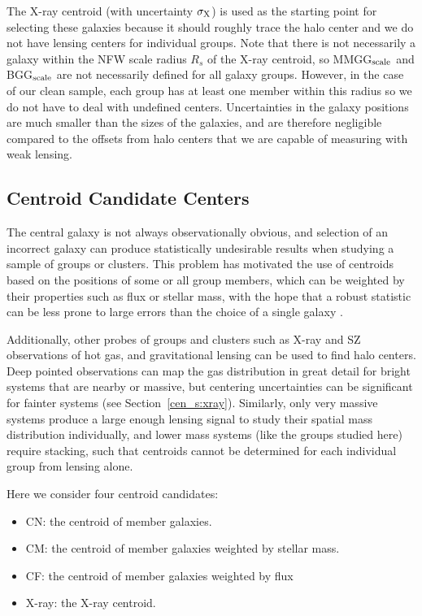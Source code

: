 The X-ray centroid (with uncertainty $\sigma_{\rm X}$) is used as the starting point for selecting these
galaxies because it should roughly trace the halo center and we do not
have lensing centers for individual groups. Note that there is not
necessarily a galaxy within the NFW scale radius $R_s$ of the X-ray
centroid, so MMGG$_{\rm scale}$ and BGG$_{\rm scale}$ are not
necessarily defined for all galaxy groups. However, in the case of our
clean sample, each group has at least one member within this radius so
we do not have to deal with undefined centers. Uncertainties in the
galaxy positions are much smaller than the sizes of the galaxies, and
are therefore negligible compared to the offsets from halo centers
that we are capable of measuring with weak lensing.

\subsection{Centroid Candidate Centers}

The central galaxy is not always observationally obvious, and
selection of an incorrect galaxy can produce statistically undesirable
results when studying a sample of groups or clusters. This problem has
motivated the use of centroids based on the positions of some or all
group members, which can be weighted by their properties such as flux
or stellar mass, with the hope that a robust statistic can be less
prone to large errors than the choice of a single galaxy
\citep[e.g.,][]{White1999, Carlberg2001, Berlind2006, Jee2011}.

Additionally, other probes of groups and clusters such as X-ray and SZ
\citep{Sunyaev1972} 
observations of hot gas, and gravitational lensing can be used to find
halo centers. Deep pointed observations can map the gas distribution
in great detail for bright systems that are nearby or massive, but
centering uncertainties can be significant for fainter systems (see
Section~\ref{cen_s:xray}). Similarly, only very massive systems produce a
large enough lensing signal to study their spatial mass distribution
individually, and lower mass systems (like the groups studied here)
require stacking, such that centroids cannot be determined for each
individual group from lensing alone.

Here we consider four centroid candidates:
\begin{itemize}
\item CN: the centroid of member galaxies.
\item CM: the centroid of member galaxies weighted by stellar mass.
\item CF: the centroid of member galaxies weighted by flux
\item X-ray: the X-ray centroid.
\end{itemize}

